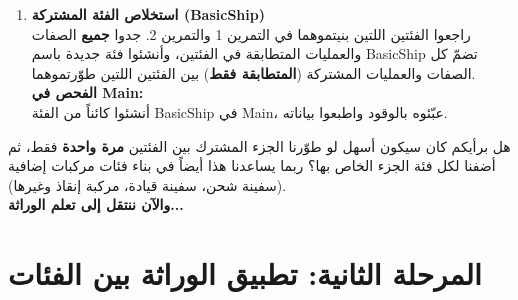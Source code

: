 \documentclass[14pt]{extarticle}
\begin{document}
\begin{enumerate}[label=\textbf{تمرين \arabic*:}, wide=0pt, leftmargin=*, itemsep=2.2em]
    \vspace{2em}
    \noindent \textbf{الفحص في \textenglish{Main}:} \\
    أنشئوا مركبة سبات، عبّئوها بالوقود، وجرّبوا سحب الوقود مرة بتاريخ يسبق تاريخ الوصول ومرة بتاريخ يساويه أو يتأخر عنه، واطبعوا النتائج.

    \item \textbf{استخلاص الفئة المشتركة (\textenglish{BasicShip})} \\
    راجعوا الفئتين اللتين بنيتموهما في التمرين 1 والتمرين 2. جدوا \textbf{جميع} الصفات والعمليات المتطابقة في الفئتين، وأنشئوا فئة جديدة باسم \textenglish{BasicShip} تضمّ كل الصفات والعمليات المشتركة (\textbf{المتطابقة فقط}) بين الفئتين اللتين طوّرتموهما. \\
    \textbf{الفحص في \textenglish{Main}:} \\
    أنشئوا كائناً من الفئة \textenglish{BasicShip} في \textenglish{Main}، عبّئوه بالوقود واطبعوا بياناته.

\end{enumerate}

\begin{boxAttention}
هل برأيكم كان سيكون أسهل لو طوّرنا الجزء المشترك بين الفئتين \textbf{مرة واحدة} فقط، ثم أضفنا لكل فئة الجزء الخاص بها؟ ربما يساعدنا هذا أيضاً في بناء فئات مركبات إضافية (سفينة شحن، سفينة قيادة، مركبة إنقاذ وغيرها). \\
\textbf{والآن ننتقل إلى تعلم الوراثة...}
\end{boxAttention}

\clearpage

\section*{المرحلة الثانية: تطبيق الوراثة بين الفئات}
\end{document}
